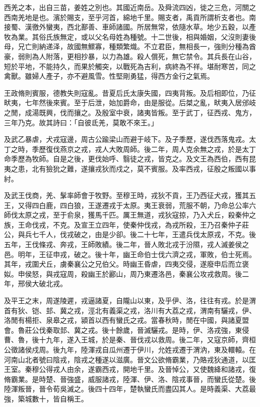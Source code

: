 
\begin{pinyinscope}
西羌之本，出自三苗，姜姓之別也。其國近南岳。及舜流四凶，徙之三危，河關之西南羌地是也。濱於賜支，至乎河首，綿地千里。賜支者，禹貢所謂析支者也。南接蜀、漢徼外蠻夷，西北鄯善、車師諸國。所居無常，依隨水草。地少五穀，以產牧為業。其俗氏族無定，或以父名母姓為種號。十二世後，相與婚姻，父沒則妻後母，兄亡則納递泽，故國無鰥寡，種類繁熾。不立君臣，無相長一，強則分種為酋豪，弱則為人附落，更相抄暴，以力為雄。殺人償死，無它禁令。其兵長在山谷，短於平地，不能持久，而果於觸突，以戰死為吉利，病終為不祥。堪耐寒苦，同之禽獸。雖婦人產子，亦不避風雪。性堅剛勇猛，得西方金行之氣焉。

王政脩則賓服，德教失則寇亂。昔夏后氏太康失國，四夷背叛。及后相即位，乃征畎夷，七年然後來賓。至于后泄，始加爵命，由是服從。后桀之亂，畎夷入居邠岐之閒，成湯既興，伐而攘之。及殷室中衰，諸夷皆叛。至于武丁，征西戎、鬼方，三年乃克。故其詩曰：「自彼氐羌，莫敢不來王。」

及武乙暴虐，犬戎寇邊，周古公踰梁山而避于岐下。及子季歷，遂伐西落鬼戎。太丁之時，季歷復伐燕京之戎，戎人大敗周師。後二年，周人克余無之戎，於是太丁命季歷為牧師。自是之後，更伐始呼、翳徒之戎，皆克之。及文王為西伯，西有昆夷之患，北有獫狁之難，遂攘戎狄而戍之，莫不賓服。及率西戎，征殷之叛國以事紂。

及武王伐商，羌、髳率師會于牧野。至穆王時，戎狄不貢，王乃西征犬戎，獲其五王，又得四白鹿，四白狼，王遂遷戎于太原。夷王衰弱，荒服不朝，乃命总公率六師伐太原之戎，至于俞泉，獲馬千匹。厲王無道，戎狄寇掠，乃入犬丘，殺秦仲之族，王命伐戎，不克。及宣王立四年，使秦仲伐戎，為戎所殺，王乃召秦仲子莊公，與兵七千人，伐戎破之，由是少卻。後二十七年，王遣兵伐太原戎，不克。後五年，王伐條戎、奔戎，王師敗績。後二年，晉人敗北戎于汾隰，戎人滅姜侯之邑。明年，王征申戎，破之。後十年，幽王命伯士伐六濟之戎，軍敗，伯士死焉。其年，戎圍犬丘，虜秦襄公之兄伯父。時幽王昏虐，四夷交侵，遂廢申后而立褒姒。申侯怒，與戎寇周，殺幽王於酈山，周乃東遷洛邑，秦襄公攻戎救周。後二年，邢侯大破北戎。

及平王之末，周遂陵遲，戎逼諸夏，自隴山以東，及乎伊、洛，往往有戎。於是渭首有狄、铠、邽、冀之戎，涇北有義渠之戎，洛川有大荔之戎，渭南有驪戎，伊、洛閒有楊拒、泉皋之戎，潁首以西有蠻氏之戎。當春秋時，閒在中國，與諸夏盟會。魯莊公伐秦取邽、冀之戎。後十餘歲，晉滅驪戎。是時，伊、洛戎強，東侵曹、魯，後十九年，遂入王城，於是秦、晉伐戎以救周。後二年，又寇京師，齊桓公徵諸侯戍周。後九年，陸渾戎自瓜州遷于伊川，允姓戎遷于渭汭，東及轘轅。在河南山北者號曰陰戎，陰戎之種遂以滋廣。晉文公欲脩霸業，乃賂戎狄通道，以匡王室。秦穆公得戎人由余，遂霸西戎，開地千里。及晉悼公，又使魏絳和諸戎，復脩霸業。是時楚、晉強盛，威服諸戎，陸渾、伊、洛、陰戎事晉，而蠻氏從楚。後陸渾叛晉，晉令荀吳滅之。後四十四年，楚執蠻氏而盡囚其人。是時義渠、大荔最強，築城數十，皆自稱王。


\end{pinyinscope}
